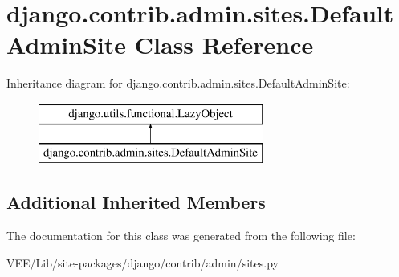 \hypertarget{classdjango_1_1contrib_1_1admin_1_1sites_1_1_default_admin_site}{}\section{django.\+contrib.\+admin.\+sites.\+Default\+Admin\+Site Class Reference}
\label{classdjango_1_1contrib_1_1admin_1_1sites_1_1_default_admin_site}
Inheritance diagram for django.\+contrib.\+admin.\+sites.\+Default\+Admin\+Site\+:\begin{figure}[H]
\begin{center}
\leavevmode
\includegraphics[height=2.000000cm]{classdjango_1_1contrib_1_1admin_1_1sites_1_1_default_admin_site}
\end{center}
\end{figure}
\subsection*{Additional Inherited Members}


The documentation for this class was generated from the following file\+:\begin{DoxyCompactItemize}
\item 
V\+E\+E/\+Lib/site-\/packages/django/contrib/admin/sites.\+py\end{DoxyCompactItemize}
